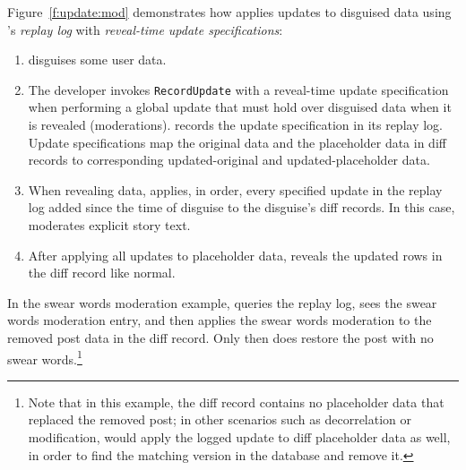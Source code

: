 %
Figure~\ref{f:update:mod} demonstrates how \sys applies updates to
disguised data using \sys's \emph{replay log} with \emph{reveal-time
update specifications}:
\begin{enumerate}[nosep]
    \item[(1)] \sys disguises some user data.
    \item[(2)] The developer invokes \texttt{RecordUpdate} with a reveal-time
        update specification when 
performing a global update that must hold over disguised data when it is
        revealed (\eg moderations). \sys records the update specification in its
        replay log. Update specifications map the original data and the
        placeholder data in diff records to corresponding updated-original and
        updated-placeholder data. 
    \item[(3)] When revealing data, \sys applies, in order, every specified
        update in the
        replay log added since the time of disguise to the disguise's diff
        records. In this case, \sys moderates explicit story text.
\item[(4)] After applying all updates to placeholder data, \sys reveals the
    updated rows in the diff record like normal.
\end{enumerate}
%
%
%
In the swear words moderation example, \sys queries the replay log, sees
the swear words moderation entry, and then applies the swear words moderation to
the removed post data in the diff record. Only then does \sys restore the post
with no swear words.\footnote{Note that in this example, the diff
record contains no placeholder data that replaced the removed post; in other
scenarios such as decorrelation or modification, \sys would apply the logged
update to diff placeholder data as well, in order to find the matching version in the
database and remove it.}

